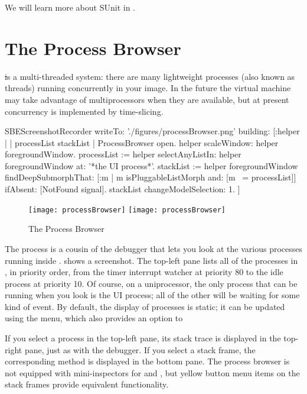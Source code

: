 \documentclass[a4paper,10pt,twoside]{book}
\begin{document}
We will learn more about SUnit in .


\section{The Process Browser}

\st is a multi-threaded system: there are many lightweight processes (also known as threads) running concurrently in your image. 
In the future the \sq virtual machine may take advantage of multiprocessors when they are available, but at present concurrency is implemented by time-slicing.

\begin{ExecuteSmalltalkScript}
SBEScreenshotRecorder writeTo: './figures/processBrowser.png' building: [:helper |
	| processList stackList |
	ProcessBrowser open.
	helper scaleWindow: helper foregroundWindow.
	processList := helper selectAnyListIn: helper foregroundWindow at: '*the UI process*'.
	stackList := helper foregroundWindow findDeepSubmorphThat: [:m | m isPluggableListMorph and: [m ~= processList]] ifAbsent: [NotFound signal].
	stackList changeModelSelection: 1.
]
\end{ExecuteSmalltalkScript}
\begin{figure}[btp]
	\begin{center}
	\ifluluelse
		{\texttt{[image: processBrowser]}}
		{\texttt{[image: processBrowser]}}
	\end{center}
	\caption{The Process Browser}
	\label{fig:processBrowser}
\end{figure}

The process  is a cousin of the debugger that lets you look at the various processes running inside \sq.
 shows a screenshot.
The top-left pane lists all of the processes in \sq, in priority order, from the timer interrupt watcher at priority 80 to the idle process at priority 10.
Of course, on a uniprocessor, the only process that can be running when you look is the UI process; all of the other will be waiting for some kind of event. 
By default, the display of processes is static; it can be updated using the  menu, which also provides an option to 

If you select a process in the top-left pane, its stack trace is displayed in the top-right pane, just as with the debugger.
If you select a stack frame, the corresponding method is displayed in the bottom pane.
The process browser is not equipped with mini-inspectors for \self and , but yellow button menu items on the stack frames provide equivalent functionality.
\end{document}
